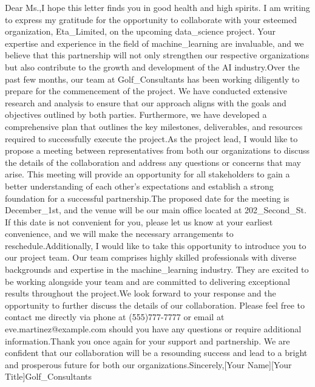 Dear Ms.,I hope this letter finds you in good health and high spirits. I am writing to express my gratitude for the opportunity to collaborate with your esteemed organization, Eta_Limited, on the upcoming data_science project. Your expertise and experience in the field of machine_learning are invaluable, and we believe that this partnership will not only strengthen our respective organizations but also contribute to the growth and development of the AI industry.Over the past few months, our team at Golf_Consultants has been working diligently to prepare for the commencement of the project. We have conducted extensive research and analysis to ensure that our approach aligns with the goals and objectives outlined by both parties. Furthermore, we have developed a comprehensive plan that outlines the key milestones, deliverables, and resources required to successfully execute the project.As the project lead, I would like to propose a meeting between representatives from both our organizations to discuss the details of the collaboration and address any questions or concerns that may arise. This meeting will provide an opportunity for all stakeholders to gain a better understanding of each other's expectations and establish a strong foundation for a successful partnership.The proposed date for the meeting is December_1st, and the venue will be our main office located at 202_Second_St. If this date is not convenient for you, please let us know at your earliest convenience, and we will make the necessary arrangements to reschedule.Additionally, I would like to take this opportunity to introduce you to our project team. Our team comprises highly skilled professionals with diverse backgrounds and expertise in the machine_learning industry. They are excited to be working alongside your team and are committed to delivering exceptional results throughout the project.We look forward to your response and the opportunity to further discuss the details of our collaboration. Please feel free to contact me directly via phone at (555)777-7777 or email at eve.martinez@example.com should you have any questions or require additional information.Thank you once again for your support and partnership. We are confident that our collaboration will be a resounding success and lead to a bright and prosperous future for both our organizations.Sincerely,[Your Name][Your Title]Golf_Consultants